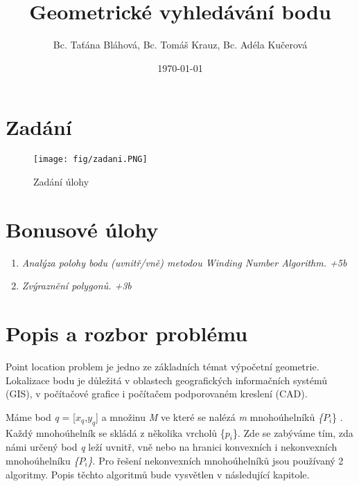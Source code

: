 \documentclass[oneside,12pt,a4paper]{book}
\title{Geometrické vyhledávání bodu}
\author{Bc. Taťána Bláhová, Bc. Tomáš Krauz, Bc. Adéla Kučerová}
\date{\today} %
\begin{document}
\maketitle

    \vspace{-2cm}
    \vfill
    \begingroup
    
    \tableofcontents
    \vspace{-0.5cm}
    \printglossary[type=\acronymtype,title=\Large Acronyms]
    \endgroup
    \vspace{-1cm}
% 


\clearpage
\chapter{Zadání}

\begin{figure}[ht!]
    \centering
    \texttt{[image: fig/zadani.PNG]}
    \caption{Zadání úlohy}
    \label{fig:Zadání úlohy}
\end{figure}



\chapter{Bonusové úlohy} 
\begin{enumerate}
    \item \emph{Analýza polohy bodu (uvnitř/vně) metodou Winding Number Algorithm.  +5b}
    \item \emph{Zvýraznění polygonů.    +3b}
\end{enumerate}


\chapter{Popis a rozbor problému} 
Point location problem je jedno ze základních témat výpočetní geometrie. Lokalizace bodu je důležitá v oblastech geografických informačních systémů (GIS), v počítačové grafice i počítačem podporovaném kreslení (CAD).\par 
Máme bod \emph{q} = [$x_q$,$y_q$]  a množinu \emph{M} ve které se nalézá \emph{m} mnohoúhelníků \emph\{$P_i$\} . Každý mnohoúhelník se skládá z několika vrcholů \{$p_i$\}.
 Zde se zabýváme tím, zda námi určený bod \emph{q} leží uvnitř, vně nebo na hranici konvexních i nekonvexních mnohoúhelníku  \emph{\{$P_i$\}}. Pro řešení nekonvexních mnohoúhelníků jsou používaný 2 algoritmy. Popis těchto algoritmů bude vysvětlen v následující kapitole.
\end{document}
